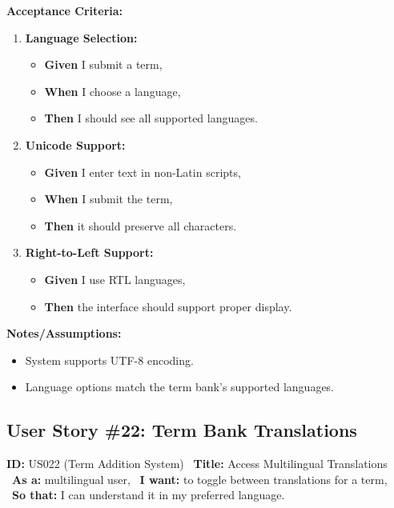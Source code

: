 \documentclass[12pt]{article}
\begin{document}
\vspace{1em}
\textbf{Acceptance Criteria:}
\begin{enumerate}
\item \textbf{Language Selection:}
\begin{itemize}
\item \textbf{Given} I submit a term,
\item \textbf{When} I choose a language,
\item \textbf{Then} I should see all supported languages.
\end{itemize}

\item \textbf{Unicode Support:}
\begin{itemize}
    \item \textbf{Given} I enter text in non-Latin scripts,
    \item \textbf{When} I submit the term,
    \item \textbf{Then} it should preserve all characters.
\end{itemize}

\item \textbf{Right-to-Left Support:}
\begin{itemize}
    \item \textbf{Given} I use RTL languages,
    \item \textbf{Then} the interface should support proper display.
\end{itemize}
\end{enumerate}

\vspace{1em}
\textbf{Notes/Assumptions:}
\begin{itemize}
\item System supports UTF-8 encoding.
\item Language options match the term bank's supported languages.
\end{itemize}

\subsection{User Story \#22: Term Bank Translations}
\textbf{ID:} US022 (Term Addition System) \
\textbf{Title:} Access Multilingual Translations \
\textbf{As a:} multilingual user, \
\textbf{I want:} to toggle between translations for a term, \
\textbf{So that:} I can understand it in my preferred language.
\end{document}
